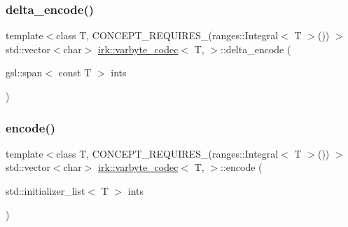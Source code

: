 \subsubsection{\texorpdfstring{delta\+\_\+encode()}{delta\_encode()}\hspace{0.1cm}{\footnotesize\ttfamily [2/2]}}
{\footnotesize\ttfamily template$<$class T, C\+O\+N\+C\+E\+P\+T\+\_\+\+R\+E\+Q\+U\+I\+R\+E\+S\+\_\+(ranges\+::\+Integral$<$ T $>$()) $>$ \\
std\+::vector$<$char$>$ \mbox{\hyperlink{structirk_1_1varbyte__codec}{irk\+::varbyte\+\_\+codec}}$<$ T, $>$\+::delta\+\_\+encode (\begin{DoxyParamCaption}\item[{gsl\+::span$<$ const T $>$}]{ints }\end{DoxyParamCaption})\hspace{0.3cm}{\ttfamily [inline]}}

\mbox{\label{structirk_1_1varbyte__codec_a73f7d831c8114aab1bc8ba1b78cb0bb3}} 
\subsubsection{\texorpdfstring{encode()}{encode()}\hspace{0.1cm}{\footnotesize\ttfamily [1/3]}}
{\footnotesize\ttfamily template$<$class T, C\+O\+N\+C\+E\+P\+T\+\_\+\+R\+E\+Q\+U\+I\+R\+E\+S\+\_\+(ranges\+::\+Integral$<$ T $>$()) $>$ \\
std\+::vector$<$char$>$ \mbox{\hyperlink{structirk_1_1varbyte__codec}{irk\+::varbyte\+\_\+codec}}$<$ T, $>$\+::encode (\begin{DoxyParamCaption}\item[{std\+::initializer\+\_\+list$<$ T $>$}]{ints }\end{DoxyParamCaption})\hspace{0.3cm}{\ttfamily [inline]}}

\mbox{\label{structirk_1_1varbyte__codec_a3e65117c796984e516769d2d28fd73bf}} 
